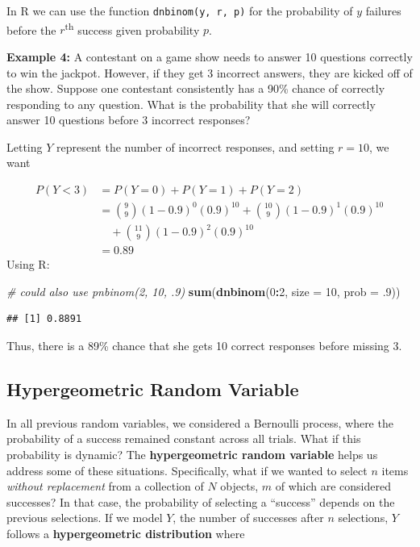 \documentclass[
]{krantz}
\newenvironment{Shaded}{\begin{snugshade}}{\end{snugshade}}
\newcommand{\CommentTok}[1]{\textcolor[rgb]{0.37,0.37,0.37}{\textit{#1}}}
\newcommand{\DataTypeTok}[1]{\textcolor[rgb]{0.27,0.27,0.27}{#1}}
\newcommand{\DecValTok}[1]{\textcolor[rgb]{0.06,0.06,0.06}{#1}}
\newcommand{\FloatTok}[1]{\textcolor[rgb]{0.06,0.06,0.06}{#1}}
\newcommand{\KeywordTok}[1]{\textcolor[rgb]{0.27,0.27,0.27}{\textbf{#1}}}
\newcommand{\NormalTok}[1]{#1}
\newcommand{\OperatorTok}[1]{\textcolor[rgb]{0.43,0.43,0.43}{\textbf{#1}}}
\begin{document}
In R we can use the function \texttt{dnbinom(y,\ r,\ p)} for the probability of \(y\) failures before the \(r\)\textsuperscript{th} success given probability \(p\).

\textbf{Example 4:} A contestant on a game show needs to answer 10 questions correctly to win the jackpot. However, if they get 3 incorrect answers, they are kicked off of the show. Suppose one contestant consistently has a 90\% chance of correctly responding to any question. What is the probability that she will correctly answer 10 questions before 3 incorrect responses?

Letting \(Y\) represent the number of incorrect responses, and setting \(r = 10\), we want

\begin{align*}
 P(Y < 3) &= P(Y=0) + P(Y=1) + P(Y=2) \\
          &= \binom{9}{9}(1-0.9)^0 (0.9)^{10} + \binom{10}{9}(1-0.9)^1 (0.9)^{10} \\
          & \quad + \binom{11}{9}(1-0.9)^2 (0.9)^{10} \\
          &= 0.89
\end{align*}
Using R:

\begin{Shaded}
\begin{Highlighting}[]
\CommentTok{# could also use pnbinom(2, 10, .9)}
\KeywordTok{sum}\NormalTok{(}\KeywordTok{dnbinom}\NormalTok{(}\DecValTok{0}\OperatorTok{:}\DecValTok{2}\NormalTok{, }\DataTypeTok{size =} \DecValTok{10}\NormalTok{, }\DataTypeTok{prob =} \FloatTok{.9}\NormalTok{))  }
\end{Highlighting}
\end{Shaded}

\begin{verbatim}
## [1] 0.8891
\end{verbatim}

Thus, there is a 89\% chance that she gets 10 correct responses before missing 3.

\hypertarget{hypergeometric-random-variable}{%
\subsection{Hypergeometric Random Variable}\label{hypergeometric-random-variable}}

In all previous random variables, we considered a Bernoulli process, where the probability of a success remained constant across all trials. What if this probability is dynamic? The \textbf{hypergeometric random variable} helps us address some of these situations. Specifically, what if we wanted to select \(n\) items \emph{without replacement} from a collection of \(N\) objects, \(m\) of which are considered successes? In that case, the probability of selecting a ``success'' depends on the previous selections.
If we model \(Y\), the number of successes after \(n\) selections, \(Y\) follows a \textbf{hypergeometric distribution}  where
\end{document}
